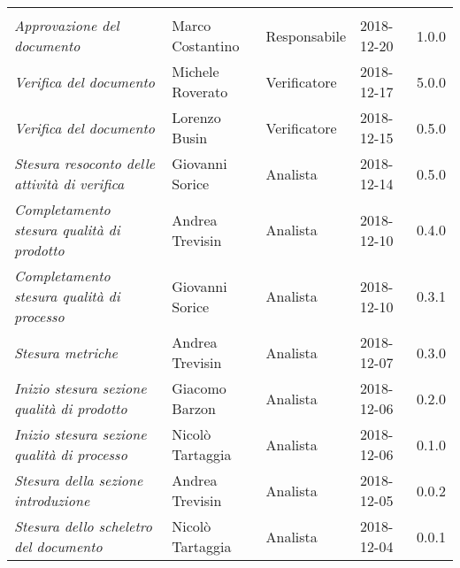 \newpage 
\section*{}
\begin{table}[H]
	\centering
	\begin{tabular}{p{4cm}|C{3cm}|C{3cm}|R{2.5cm}|R{2cm}}
		
		 & & & & \\
		
		
		\emph{Approvazione del documento} & Marco Costantino & Responsabile & 2018-12-20 & 1.0.0 \\
		\hline
		
		\emph{Verifica del documento} & Michele Roverato & Verificatore & 2018-12-17 & 5.0.0 \\
		\hline
		
		\emph{Verifica del documento} & Lorenzo Busin & Verificatore & 2018-12-15 & 0.5.0 \\
		\hline
		
		\emph{Stesura resoconto delle attività di verifica} & Giovanni Sorice & Analista & 2018-12-14 & 0.5.0 \\
		\hline
		
		\emph{Completamento stesura qualità di prodotto} & Andrea Trevisin & Analista & 2018-12-10 & 0.4.0 \\
		\hline
		
		\emph{Completamento stesura qualità di processo} & Giovanni Sorice & Analista & 2018-12-10 & 0.3.1 \\
		\hline
		
		\emph{Stesura metriche} & Andrea Trevisin & Analista & 2018-12-07 & 0.3.0 \\
		\hline
		
		\emph{Inizio stesura sezione qualità di prodotto} & Giacomo Barzon & Analista & 2018-12-06 & 0.2.0 \\
		\hline
		
		\emph{Inizio stesura sezione qualità di processo} & Nicolò Tartaggia & Analista & 2018-12-06 & 0.1.0 \\
		\hline
		
		\emph{Stesura della sezione introduzione } & Andrea Trevisin & Analista & 2018-12-05 & 0.0.2 \\
		\hline
		
		\emph{Stesura dello scheletro del documento} & Nicolò Tartaggia & Analista & 2018-12-04 & 0.0.1 \\
		
	\end{tabular}
	
\end{table}


\clearpage
